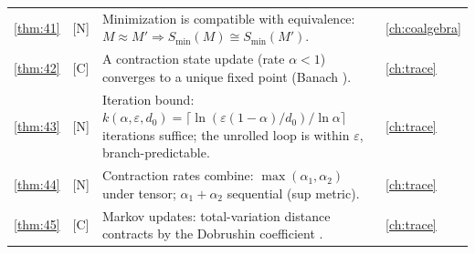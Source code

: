 \begin{table}[!htbp]
\begin{tabular}{@{}clp{7.2cm}l@{}}
\ref{thm:41} & [N] & Minimization is compatible with equivalence: $M \approx M' \Rightarrow S_{\min} (M) \cong S_{\min} (M')$. & \autoref{ch:coalgebra}\\
\ref{thm:42} & [C] & A contraction state update (rate $\alpha < 1$) converges to a unique fixed point (Banach \cite{banach}). & \autoref{ch:trace}\\
\ref{thm:43} & [N] & Iteration bound: $k (\alpha,\varepsilon,d_0) = \lceil \ln (\varepsilon (1-\alpha)/d_0)/\ln\alpha\rceil$ iterations suffice; the unrolled loop is within $\varepsilon$, branch-predictable. & \autoref{ch:trace}\\
\ref{thm:44} & [N] & Contraction rates combine: $\max (\alpha_1,\alpha_2)$ under tensor; $\alpha_1+\alpha_2$ sequential (sup metric). & \autoref{ch:trace}\\
\ref{thm:45} & [C] & Markov updates: total-variation distance contracts by the Dobrushin coefficient \cite{dobroushin}. & \autoref{ch:trace}\\
\bottomrule
\end{tabular}
\end{table}

